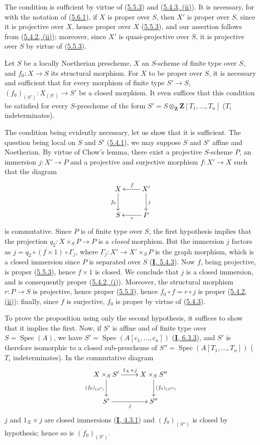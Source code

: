 The condition is sufficient by virtue of (\hyperref[II.5.5.3]{5.5.3}) and
(\hyperref[II.5.4.3]{5.4.3, (ii)}). It is necessary, for with the
notation of (\hyperref[II.5.6.1]{5.6.1}), if $X$ is proper over $S$, then
$X'$ is proper over $S$, since it is projective over $X$, hence proper over
$X$ (\hyperref[II.5.5.3]{5.5.3}), and our assertion follows from
(\hyperref[II.5.4.2]{5.4.2, (ii)}); moreover, since $X'$ is
quasi-projective over $S$, it is projective over $S$ by virtue of
(\hyperref[II.5.5.3]{5.5.3}).

\begin{corollary}[5.6.3]
\label{II.5.6.3}
Let $S$ be a locally Noetherian prescheme, $X$ an $S$-scheme of finite type
over $S$, and $f_0:X\to S$ its structural morphism. For $X$ to be proper
over $S$, it is necessary and sufficient that for every morphism \textup{of finite
type} $S'\to S$, $(f_0)_{(S')}:X_{(S')}\to S'$ be a closed morphism. It even
suffices that this condition be satisfied for every $S$-prescheme of the form
$S'=S\otimes_{\mathbf Z}\mathbf Z[T_1,\ldots,T_n]$ ($T_i$ indeterminates).
\end{corollary}

The condition being evidently necessary, let us show that it is sufficient.
The question being local on $S$ and $S'$ (\hyperref[II.5.4.1]{5.4.1}), we
may suppose $S$ and $S'$ affine and Noetherian. By virtue of Chow's lemma,
there exist a projective $S$-scheme $P$, an immersion $j:X'\to P$ and a
projective and surjective morphism $f:X'\to X$ such that the diagram
\[
\xymatrix{
X\ar[d]_{f_0} & X'\ar[l]_f\ar[d]^j\\
S & P\ar[l]^r
}
\]
is commutative. Since $P$ is of finite type over $S$, the first hypothesis
implies that the projection $q_2:X\times_SP\to P$ is a \emph{closed} morphism. But
the immersion $j$ factors as $j=q_2\circ(f\times1)\circ\Gamma_j$,
where $\Gamma_j:X'\to X'\times_SP$ is the graph morphism, which is a
closed immersion since $P$ is separated over $S$
(\hyperref[I.5.4.3]{\textbf{I}, 5.4.3}). Now $f$, being projective, is proper
(\hyperref[II.5.5.3]{5.5.3}), hence $f\times1$ is closed. We conclude that
$j$ is a closed immersion, and is consequently proper
(\hyperref[II.5.4.2]{5.4.2, (i)}). Moreover, the structural morphism
$r:P\to S$ is projective, hence proper (\hyperref[II.5.5.3]{5.5.3}), hence
$f_0\circ f=r\circ j$ is proper
(\hyperref[II.5.4.2]{5.4.2, (ii)}); finally, since $f$ is surjective,
$f_0$ is proper by virtue of (\hyperref[II.5.4.3]{5.4.3}).

To prove the proposition using only the second hypothesis, it suffices to
show that it implies the first. Now, if $S'$ is affine and of finite type
over $S=\operatorname{Spec}(A)$,
we have $S'=\operatorname{Spec}(A[c_1,\ldots,c_n])$
(\hyperref[I.6.3.3]{\textbf{I}, 6.3.3}), and $S'$ is therefore isomorphic to a
closed sub-prescheme of $S''=\operatorname{Spec}(A[T_1,\ldots,T_n])$ ($T_i$
indeterminates). In the commutative diagram
\[
\xymatrix{
X\times_SS'\ar[r]^{1_X\times j}\ar[d]_{(f_0)_{(S')}} &
X\times_SS''\ar[d]^{(f_0)_{(S'')}}\\
S'\ar[r]_j & S''
}
\]
$j$ and $1_X\times j$ are closed immersions
(\hyperref[I.4.3.1]{\textbf{I}, 4.3.1}) and $(f_0)_{(S'')}$ is closed by
hypothesis; hence so is $(f_0)_{(S')}$.

